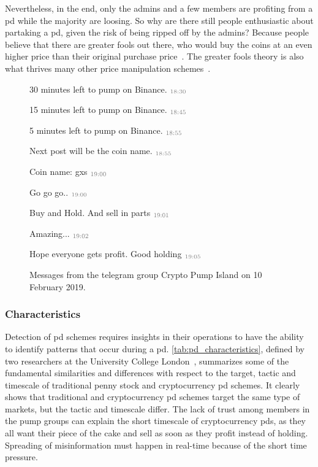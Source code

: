 Nevertheless, in the end, only the admins and a few members are profiting from a \ac{pd} while the majority are loosing. So why are there still people enthusiastic about partaking a \ac{pd}, given the risk of being ripped off by the admins? Because people believe that there are greater fools out there, who would buy the coins at an even higher price than their original purchase price~\cite{P&D_anatomy}. The greater fools theory is also what thrives many other price manipulation schemes~\cite{dissecting}.
\begin{figure}[ht]
    \begin{leftbubbles}
    30 minutes left to pump on Binance. $\color{gray}_{\text{18:30}}$
    
    15 minutes left to pump on Binance. $\color{gray}_{\text{18:45}}$
    
    5 minutes left to pump on Binance. $\color{gray}_{\text{18:55}}$
    
    Next post will be the coin name. $\color{gray}_{\text{18:55}}$
    
    Coin name: gxs $\color{gray}_{\text{19:00}}$
    
    Go go go.. $\color{gray}_{\text{19:00}}$

    Buy and Hold. And sell in parts $\color{gray}_{\text{19:01}}$
    
    Amazing... $\color{gray}_{\text{19:02}}$
    
    Hope everyone gets profit.
    Good holding $\color{gray}_{\text{19:05}}$
    \end{leftbubbles}
    \caption[\Acf{pd} group insight]{Messages from the telegram group Crypto Pump Island on 10 February 2019.}
    \label{fig:chat_pump}
\end{figure}

\subsubsection{Characteristics}
Detection of \ac{pd} schemes requires insights in their operations to have the ability to identify patterns that occur during a \ac{pd}. \autoref{tab:pd_characteristics}, defined by two researchers at the University College London~\cite{P&D_anatomy}, summarizes some of the fundamental similarities and differences with respect to the target, tactic and timescale of traditional penny stock and cryptocurrency \ac{pd} schemes. It clearly shows that traditional and cryptocurrency \ac{pd} schemes target the same type of markets, but the tactic and timescale differ. The lack of trust among members in the pump groups can explain the short timescale of cryptocurrency \acp{pd}, as they all want their piece of the cake and sell as soon as they profit instead of holding. Spreading of misinformation must happen in real-time because of the short time pressure.

